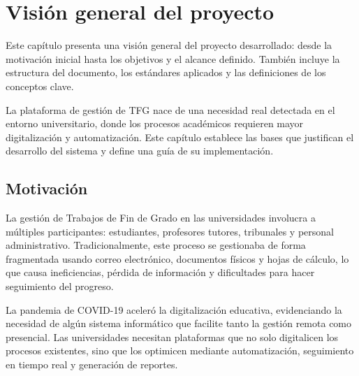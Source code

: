 \documentclass[12pt,a4paper,oneside]{report}
\begin{document}


\renewcommand{\contentsname}{Índice}
\thispagestyle{plain}
\tableofcontents
\clearpage

\renewcommand{\listfigurename}{Lista de Figuras}
\renewcommand{\figurename}{Figura}
\thispagestyle{plain}
\listoffigures
\clearpage

\markboth{}{}

\setcounter{chapter}{0}

\chapter{Visión general del
proyecto}\label{visiuxf3n-general-del-proyecto}
Este capítulo presenta una visión general del proyecto desarrollado: desde la motivación inicial hasta los objetivos y el alcance definido. También incluye la estructura del documento, los estándares aplicados y las definiciones de los conceptos clave.

La plataforma de gestión de TFG nace de una necesidad real detectada en el entorno universitario, donde los procesos académicos requieren mayor digitalización y automatización. Este capítulo establece las bases que justifican el desarrollo del sistema y define una guía de su implementación.

\section{Motivación}\label{motivaciuxf3n}

La gestión de Trabajos de Fin de Grado en las universidades involucra a múltiples participantes: estudiantes, profesores tutores, tribunales y personal administrativo. Tradicionalmente, este proceso se gestionaba de forma fragmentada usando correo electrónico, documentos físicos y hojas de cálculo, lo que causa ineficiencias, pérdida de información y dificultades para hacer seguimiento del progreso.

La pandemia de COVID-19 aceleró la digitalización educativa, evidenciando la necesidad de algún sistema informático que facilite tanto la gestión remota como presencial. Las universidades necesitan plataformas que no solo digitalicen los procesos existentes, sino que los optimicen mediante automatización, seguimiento en tiempo real y generación de reportes.
\end{document}

